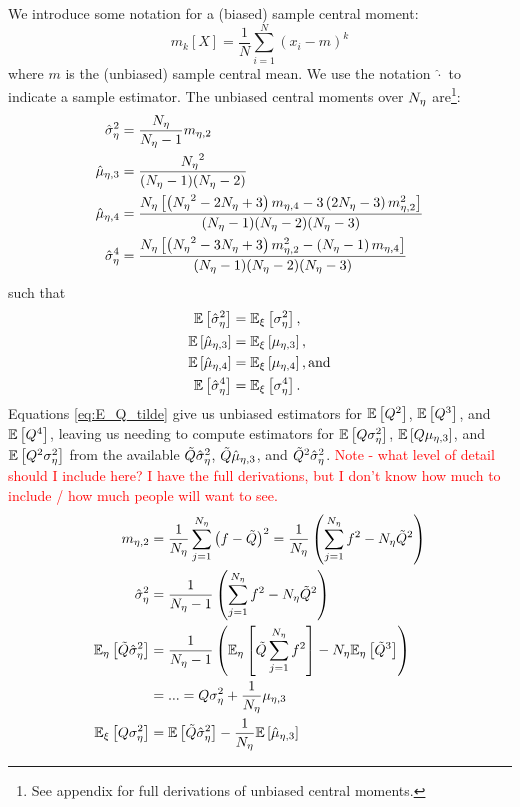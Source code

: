 We introduce some notation for a (biased) sample central moment:
\begin{equation}
    m_k[X] = \frac{1}{N}\sum_{i=1}^N \left(x_i - m\right)^k
\end{equation}
where $m$ is the (unbiased) sample central mean. We use the notation $\hat{\cdot}$ to indicate a sample estimator. The unbiased central moments over ${N_\eta}$ are\footnote{See appendix for full derivations of unbiased central moments.}:
\begin{equation}
    \begin{split}
        \hat{\sigma}_{\eta}^2 &= \frac{{N_\eta}}{{N_\eta}-1} m_{\eta,2} \\
        \hat{\mu}_{\eta,3} &= \frac{{N_\eta}^2}{({N_\eta}-1)({N_\eta}-2)} \\
        \hat{\mu}_{\eta,4} &= \frac{{N_\eta}\left[ \left({N_\eta}^2 - 2{N_\eta} + 3\right)m_{\eta,4} - 3\left(2{N_\eta}-3\right)m_{\eta,2}^2 \right]}{({N_\eta}-1)({N_\eta}-2)({N_\eta}-3)} \\
        \hat{\sigma}_\eta^4 &= \frac{{N_\eta}\left[ \left({N_\eta}^2 - 3{N_\eta} + 3\right)m_{\eta,2}^2 - \left({N_\eta}-1\right)m_{\eta,4} \right]}{({N_\eta}-1)({N_\eta}-2)({N_\eta}-3)}
    \end{split}
\end{equation} such that 
\begin{equation}
    \begin{split}
        \mathbb{E}\left[\hat{\sigma}_{\eta}^2\right] &= \mathbb{E}_\xi\left[\sigma^2_\eta\right], \\
        \mathbb{E}\left[\hat{\mu}_{\eta,3}\right] &= \mathbb{E}_\xi\left[\mu_{\eta,3}\right], \\
        \mathbb{E}\left[\hat{\mu}_{\eta,4}\right] &= \mathbb{E}_\xi\left[\mu_{\eta,4}\right], \text{and}\\
        \mathbb{E}\left[\hat{\sigma}_\eta^4\right] &= \mathbb{E}_\xi\left[\sigma_\eta^4\right] .
    \end{split}
\end{equation}
Equations \eqref{eq:E_Q_tilde} give us unbiased estimators for $\mathbb{E}\left[Q^2\right]$, $\mathbb{E}\left[Q^3\right]$, and $\mathbb{E}\left[Q^4\right]$, leaving us needing to compute estimators for $\mathbb{E}\left[Q\sigma^2_\eta\right]$, $\mathbb{E}\left[Q\mu_{\eta,3}\right]$, and $\mathbb{E}\left[Q^2\sigma^2_\eta\right]$ from the available $\tilde{Q} \hat{\sigma}^2_\eta$, $\tilde{Q} \hat{\mu}_{\eta,3}$, and $\tilde{Q}^2 \hat{\sigma}^2_\eta$. \textcolor{red}{Note - what level of detail should I include here? I have the full derivations, but I don't know how much to include / how much people will want to see.}
\begin{equation}
    \begin{split}
        m_{\eta,2} &= \frac{1}{{N_\eta}}\sum_{j=1}^{N_\eta} \left(f-\tilde{Q}\right)^2 = \frac{1}{{N_\eta}}\left(\sum_{j=1}^{N_\eta} f^2 - {N_\eta}\tilde{Q}^2\right) \\
        \hat{\sigma}^2_\eta &= \frac{1}{{N_\eta}-1}\left(\sum_{j=1}^{N_\eta} f^2 - {N_\eta}\tilde{Q}^2\right) \\
        \mathbb{E}_\eta\left[\tilde{Q}\hat{\sigma}^2_\eta\right] &= \frac{1}{{N_\eta}-1}\left( \mathbb{E}_\eta\left[\tilde{Q}\sum_{j=1}^{N_\eta} f^2\right] - {N_\eta}\mathbb{E}_\eta\left[\tilde{Q}^3\right]\right) \\
        &= ... = Q\sigma^2_\eta + \frac{1}{{N_\eta}}\mu_{\eta,3} \\
        \mathbb{E}_\xi\left[Q\sigma^2_\eta\right] &= \mathbb{E}\left[\tilde{Q} \hat{\sigma}^2_\eta\right] - \frac{1}{{N_\eta}}\mathbb{E}\left[\hat{\mu}_{\eta,3}\right]
    \end{split}
\end{equation}
